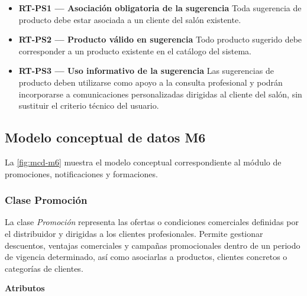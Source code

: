 \begin{itemize}

      \item \textbf{RT-PS1 — Asociación obligatoria de la sugerencia}
            Toda sugerencia de producto debe estar asociada a un cliente del salón existente.
      \item \textbf{RT-PS2 — Producto válido en sugerencia}
            Todo producto sugerido debe corresponder a un producto existente en el catálogo del sistema.
      \item \textbf{RT-PS3 — Uso informativo de la sugerencia}
            Las sugerencias de producto deben utilizarse como apoyo a la consulta profesional y podrán incorporarse a comunicaciones personalizadas dirigidas al cliente del salón, sin sustituir el criterio técnico del usuario.
\end{itemize}

\subsection{Modelo conceptual de datos M6}

La \autoref{fig:mcd-m6} muestra el modelo conceptual correspondiente al módulo de promociones, notificaciones y formaciones.


\subsubsection{Clase Promoción}

La clase \textit{Promoción} representa las ofertas o condiciones comerciales definidas por el distribuidor y dirigidas a los clientes profesionales. Permite gestionar descuentos, ventajas comerciales y campañas promocionales dentro de un periodo de vigencia determinado, así como asociarlas a productos, clientes concretos o categorías de clientes.

\textbf{Atributos}

